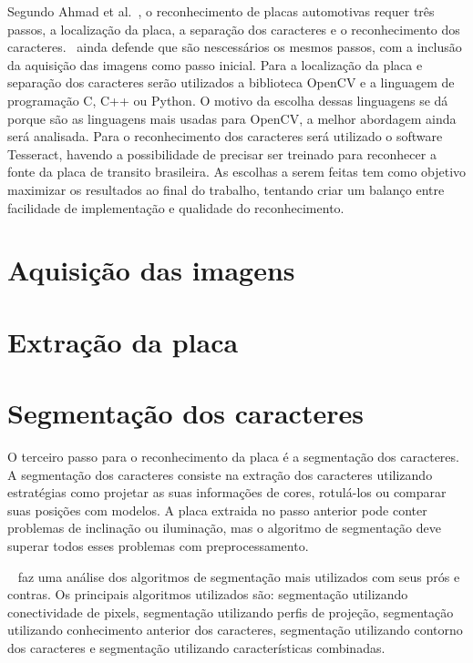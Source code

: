 Segundo Ahmad et al.~\cite{ahmad2015automatic}, o reconhecimento de placas
automotivas requer três passos, a localização da placa, a separação dos
caracteres e o reconhecimento dos caracteres.~\cite{s2013automatic} ainda defende que são nescessários os mesmos passos, com a inclusão da aquisição das imagens como passo inicial. Para a localização da placa e
separação dos caracteres serão utilizados a biblioteca OpenCV e a linguagem de
programação C, C++ ou Python. O motivo da escolha dessas linguagens se dá porque
são as linguagens mais usadas para OpenCV, a melhor abordagem ainda será
analisada. Para o reconhecimento dos caracteres será utilizado o software Tesseract, havendo a possibilidade de precisar ser treinado para reconhecer a fonte da placa de transito brasileira. As escolhas a serem
feitas tem como objetivo maximizar os resultados ao final do trabalho, tentando
criar um balanço entre facilidade de implementação e qualidade do
reconhecimento.

\section{Aquisição das imagens}
\label{sec:aquisicao}

\section{Extração da placa}
\label{sec:extracao}

\section{Segmentação dos caracteres}
\label{sec:segmentacao}

O terceiro passo para o reconhecimento da placa é a segmentação dos caracteres. A segmentação dos caracteres consiste na extração dos caracteres utilizando estratégias como projetar as suas informações de cores, rotulá-los ou comparar suas posições com modelos. A placa extraida no passo anterior pode conter problemas de inclinação ou iluminação, mas o algoritmo de segmentação deve superar todos esses problemas com preprocessamento. ~\cite{s2013automatic}

~\cite{s2013automatic} faz uma análise dos algoritmos de segmentação mais utilizados com seus prós e contras. Os principais algoritmos utilizados são: segmentação utilizando conectividade de pixels, segmentação utilizando perfis de projeção, segmentação utilizando conhecimento anterior dos caracteres, segmentação utilizando contorno dos caracteres e segmentação utilizando características combinadas.

